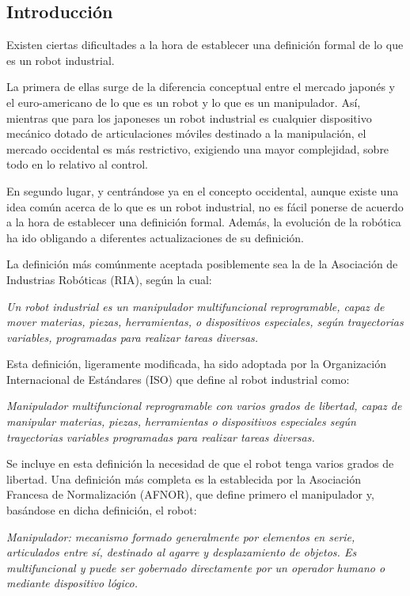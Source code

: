 \documentclass[12pt,a4papert,woside,openright,titlepage,final]{book}
\begin{document}
\subsection{Introducción}

Existen ciertas dificultades a la hora de establecer una definición formal de lo
que es un robot industrial. 

La primera de ellas surge de la diferencia
conceptual entre el mercado japonés y el euro-americano de lo que es un robot y
lo que es un manipulador. Así, mientras que para los japoneses un robot
industrial es cualquier dispositivo mecánico dotado de articulaciones móviles
destinado a la manipulación, el mercado occidental es más restrictivo, exigiendo
una mayor complejidad, sobre todo en lo relativo al control. 

En segundo lugar, y centrándose ya en el concepto occidental, aunque existe una
idea común acerca de lo que es un robot industrial, no es fácil ponerse de
acuerdo a la hora de establecer una definición formal. Además, la evolución de
la robótica ha ido obligando a diferentes actualizaciones de su definición.

La definición más comúnmente aceptada posiblemente sea la de la Asociación de
Industrias Robóticas (RIA), según la cual:

\emph{Un robot industrial es un manipulador multifuncional reprogramable, capaz de
mover materias, piezas, herramientas, o dispositivos especiales, según
trayectorias variables, programadas para realizar tareas diversas.}

Esta definición, ligeramente modificada, ha sido adoptada por la Organización
Internacional de Estándares (ISO) que define al robot industrial como:

\emph{Manipulador multifuncional reprogramable con varios grados de libertad, capaz de
manipular materias, piezas, herramientas o dispositivos especiales según
trayectorias variables programadas para realizar tareas diversas.}

Se incluye en esta definición la necesidad de que el robot tenga varios grados
de libertad. Una definición más completa es la establecida por la Asociación
Francesa de Normalización (AFNOR), que define primero el manipulador y,
basándose en dicha definición, el robot:

\emph{Manipulador: mecanismo formado generalmente por elementos en serie, articulados
entre sí, destinado al agarre y desplazamiento de objetos. Es multifuncional y
puede ser gobernado directamente por un operador humano o mediante dispositivo
lógico.}
\end{document}
